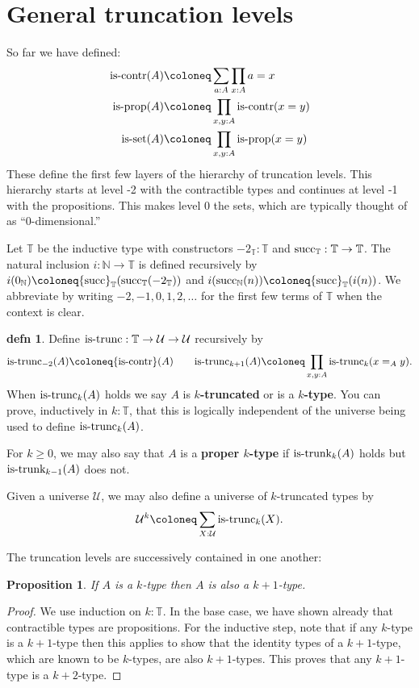 \documentclass{amsart}
\theoremstyle{theorem}
\newtheorem*{prop}{Proposition}
\theoremstyle{definition}
\newtheorem*{defn}{defn}
\theoremstyle{remark}
\newcommand{\0}{\mathbbe{0}}
\newcommand{\1}{\mathbbe{1}}
\newcommand{\2}{\mathbbe{2}}
\newcommand{\3}{\mathbbe{3}}
\newcommand{\4}{\mathbbe{4}}
\newcommand{\term}[1]{{\textup{#1}}}
\newcommand{\type}[1]{{\textup{#1}}}
\newcommand{\bN}{{\mathbb{N}}}
\newcommand{\bT}{{\mathbb{T}}}
\newcommand{\suc}{\term{succ}_{\bN}}
\newcommand{\UU}{{\mathcal{U}}}
\newcommand{\is}[1]{\type{is-{#1}}}
\newcommand{\iscontr}{\type{is-contr}}
\newcommand{\isprop}{\type{is-prop}}
\begin{document}
\section*{General truncation levels}

So far we have defined:
\begin{align*}
\iscontr(A) &\coloneq \sum_{a:A} \prod_{x:A} a=x\\
\isprop(A) &\coloneq \prod_{x,y:A} \iscontr(x=y) \\
\is{set}(A) &\coloneq \prod_{x,y:A} \isprop(x=y)
\end{align*}
These define the first few layers of the hierarchy of truncation levels. This hierarchy starts at level -2 with the contractible types and continues at level -1 with the propositions. This makes level 0 the sets, which are typically thought of as ``0-dimensional.''

Let $\bT$ be the inductive type with constructors $-2_\bT : \bT$ and $\term{succ}_\bT : \bT \to \bT$. The natural inclusion $i \colon \bN \to \bT$ is defined recursively by $i(0_\bN) \coloneq \term{succ}_\bT (\term{succ}_\bT (-2_\bT))$ and $i(\suc(n)) \coloneq \term{succ}_\bT (i(n))$. We abbreviate by writing $-2,-1,0,1,2,\ldots$ for the first few terms of $\bT$ when the context is clear.

\begin{defn} Define $\is{trunc} : \bT \to \UU \to \UU$ recursively by
\[ \is{trunc}_{-2}(A) \coloneq \iscontr(A) \qquad \is{trunc}_{k+1}(A) \coloneq \prod_{x,y:A} \is{trunc}_k(x=_Ay).\]
When $\is{trunc}_k(A)$ holds we say $A$ is \textbf{$k$-truncated} or is a \textbf{$k$-type}. You can prove, inductively in $k : \bT$, that this is logically independent of the universe being used to define $\is{trunc}_k(A)$.
\end{defn}



For $k \geq 0$, we may also say that $A$ is a \textbf{proper $k$-type} if $\is{trunk}_k(A)$ holds but $\is{trunk}_{k-1}(A)$ does not.



Given a universe $\UU$, we may also define a universe of $k$-truncated types by
\[ \UU^k \coloneq \sum_{X:\UU} \is{trunc}_k(X).\]


The truncation levels are successively contained in one another:

\begin{prop} If $A$ is a $k$-type then $A$ is also a $k+1$-type.
\end{prop}
\begin{proof}
We use induction on $k : \bT$. In the base case, we have shown already that contractible types are propositions. For the inductive step, note that if any $k$-type is a $k+1$-type then this applies to show that the identity types of a $k+1$-type, which are known to be $k$-types, are also $k+1$-types. This proves that any $k+1$-type is a $k+2$-type.
\end{proof}
\end{document}
